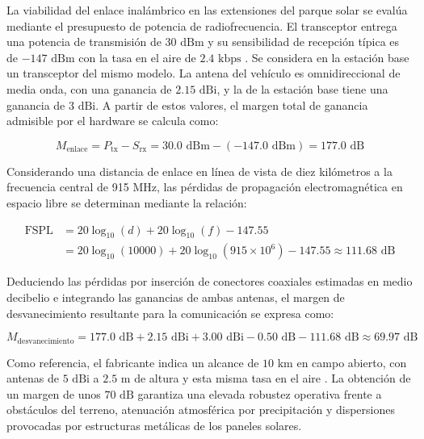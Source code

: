 \documentclass[../../General.tex]{subfiles}
\begin{document}
La viabilidad del enlace inalámbrico en las extensiones del parque solar se evalúa mediante el presupuesto de potencia de radiofrecuencia. El transceptor entrega una potencia de transmisión de $30\text{ dBm}$ y su sensibilidad de recepción típica es de $-147\text{ dBm}$ con la tasa en el aire de $2.4\text{ kbps}$ \citep{ebyte_e220_900t30d}. Se considera en la estación base un transceptor del mismo modelo. La antena del vehículo es omnidireccional de media onda, con una ganancia de $2.15\text{ dBi}$, y la de la estación base tiene una ganancia de $3\text{ dBi}$. A partir de estos valores, el margen total de ganancia admisible por el hardware se calcula como:

\begin{equation}
M_{\text{enlace}} = P_{\text{tx}} - S_{\text{rx}} = 30.0\text{ dBm} - (-147.0\text{ dBm}) = 177.0\text{ dB}
\end{equation}

 Considerando una distancia de enlace en línea de vista de diez kilómetros a la frecuencia central de 915 MHz, las pérdidas de propagación electromagnética en espacio libre se determinan mediante la relación:

\begin{equation}
\begin{split}
\text{FSPL} &= 20\log_{10}(d) + 20\log_{10}(f) - 147.55 \\
&= 20\log_{10}(10000) + 20\log_{10}(915\times 10^6) - 147.55 \approx 111.68\text{ dB}
\end{split}
\end{equation}

Deduciendo las pérdidas por inserción de conectores coaxiales estimadas en medio decibelio e integrando las ganancias de ambas antenas, el margen de desvanecimiento resultante para la comunicación se expresa como:

\begin{equation}
M_{\text{desvanecimiento}} = 177.0\text{ dB} + 2.15\text{ dBi} + 3.00\text{ dBi} - 0.50\text{ dB} - 111.68\text{ dB} \approx 69.97\text{ dB}
\end{equation}

Como referencia, el fabricante indica un alcance de $10\text{ km}$ en campo abierto, con antenas de $5\text{ dBi}$ a $2.5\text{ m}$ de altura y esta misma tasa en el aire \citep{ebyte_e220_900t30d}. La obtención de un margen de unos $70\text{ dB}$ garantiza una elevada robustez operativa frente a obstáculos del terreno, atenuación atmosférica por precipitación y dispersiones provocadas por estructuras metálicas de los paneles solares.
\end{document}
